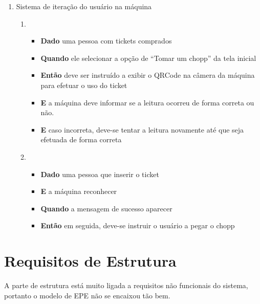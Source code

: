 \begin{enumerate}
			\item Sistema de iteração do usuário na máquina
				\begin{enumerate}
					\item 
						\begin{itemize}
							\item \textbf{Dado} uma pessoa com tickets comprados
							\item \textbf{Quando} ele selecionar a opção de “Tomar um chopp” da tela inicial
							\item \textbf{Então} deve ser instruído a exibir o QRCode na câmera da máquina para efetuar o uso do ticket
							\item \textbf{E} a máquina deve informar se a leitura ocorreu de forma correta ou não.
							\item \textbf{E} caso incorreta, deve-se tentar a leitura novamente até que seja efetuada de forma correta
						\end{itemize}

					\item 
						\begin{itemize}
							\item \textbf{Dado} uma pessoa que inserir o ticket
							\item \textbf{E} a máquina reconhecer
							\item \textbf{Quando} a mensagem de sucesso aparecer
							\item \textbf{Então} em seguida, deve-se instruir o usuário a pegar o chopp
						\end{itemize}
				\end{enumerate}

		\end{enumerate}

	\section[Requisitos de Estrutura]{Requisitos de Estrutura}
		A parte de estrutura está muito ligada a requisitos não funcionais do sistema, portanto o modelo de EPE não se encaixou tão bem.

